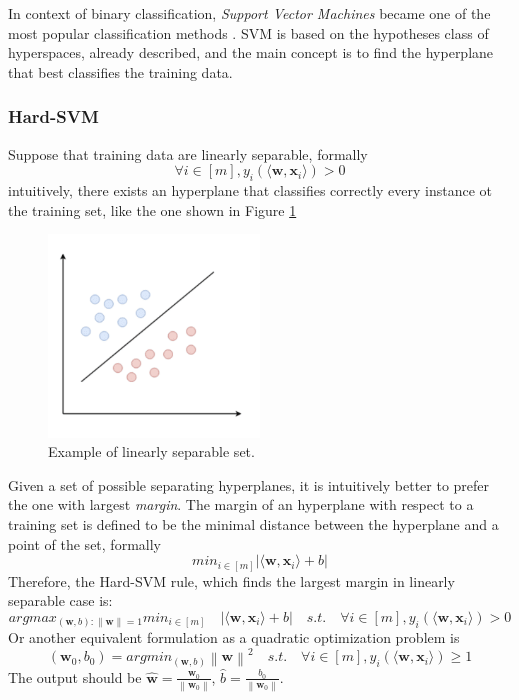 In context of binary classification, \textit{Support Vector Machines} became one of the most popular classification methods \cite{article-svm}. SVM is based on the hypotheses class of hyperspaces, already described, and the main concept is to find the hyperplane that best classifies the training data.

\subsubsection{Hard-SVM}

Suppose that training data are linearly separable, formally
\[ \forall i \in [m], y_i (\langle \mathbf{w}, \mathbf{x}_i \rangle) > 0 \]
intuitively, there exists an hyperplane that classifies correctly every instance ot the training set, like the one shown in Figure \ref{fig:linearly-separable}

\begin{figure}[ht]
	\centering
	\includegraphics[width=0.5\textwidth]{figures/linearly-separable.png}
	\caption{Example of linearly separable set.}
	\label{fig:linearly-separable}
\end{figure}

Given a set of possible separating hyperplanes, it is intuitively better to prefer the one with largest \textit{margin}. The margin of an hyperplane with respect to a training set is defined to be the minimal distance between the hyperplane and a point of the set, formally
\[ min_{i \in [m]} | \langle \mathbf{w}, \mathbf{x}_i \rangle + b | \]
Therefore, the Hard-SVM rule, which finds the largest margin in linearly separable case is:
\[ argmax_{(\mathbf{w}, b) : \left\lVert \mathbf{w} \right\rVert = 1} min_{i \in [m]} \quad | \langle \mathbf{w}, \mathbf{x}_i \rangle + b | \quad s.t. \quad \forall i \in [m], y_i (\langle \mathbf{w}, \mathbf{x}_i \rangle) > 0 \]
Or another equivalent formulation as a quadratic optimization problem is
\[ (\mathbf{w}_0, b_0) = argmin_{(\mathbf{w}, b)} \left\lVert \mathbf{w} \right\rVert ^2 \quad s.t. \quad \forall i \in [m], y_i (\langle \mathbf{w}, \mathbf{x}_i \rangle) \ge 1 \]
The output should be $\hat{\mathbf{w}} = \frac{\mathbf{w}_0}{\left\lVert \mathbf{w}_0 \right\rVert}$, $\hat{b} = \frac{b_0}{\left\lVert \mathbf{w}_0 \right\rVert}$.

